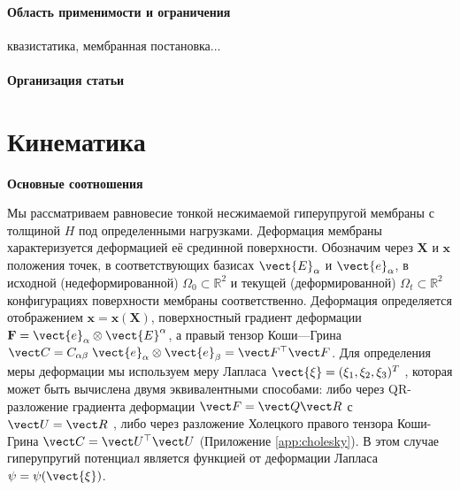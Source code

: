 
\paragraph{Область применимости и ограничения}
квазистатика, мембранная постановка...

\paragraph{Организация статьи}

\section{Кинематика}
\textbf{Основные соотношения}

Мы рассматриваем равновесие тонкой несжимаемой гиперупругой мембраны с толщиной $H$ под
определенными нагрузками.
Деформация мембраны характеризуется деформацией её срединной поверхности. 
Обозначим через \(\mathbf{X}\) и \(\mathbf{x}\) положения точек, 
в соответствующих базисах \(\vect{E}_{\alpha}\) и \(\vect{e}_{\alpha}\), 
в исходной (недеформированной) \(\Omega_0 \subset \mathbb{R}^2\) и текущей (деформированной) \(\Omega_t \subset \mathbb{R}^2\)
конфигурациях поверхности мембраны соответственно. 
Деформация определяется отображением \(\mathbf{x} = \mathbf{x}(\mathbf{X})\), 
поверхностный градиент деформации \(\mathbf{F} = \vect{e}_{\alpha} \otimes \vect{E}^{\alpha}\),
а правый тензор Коши—Грина \(\vect C = C_{\alpha\beta} \;\vect{e}_{\alpha} \otimes \vect{e}_{\beta} = \vect F^{\top} \vect F\). 
Для определения меры деформации мы используем меру Лапласа \(\vect{\xi} = (\xi_1 , \xi_2 , \xi_3)^T\) \cite{xi2023},
которая может быть вычислена двумя эквивалентными способами: 
либо через QR-разложение градиента деформации \(\vect F = \vect Q \vect R\) с \(\vect U = \vect R\) , 
либо через разложение Холецкого правого тензора Коши-Грина \(\vect C = \vect U^{\top}\vect U\) (Приложение \ref{app:cholesky}).
В этом случае гиперупругий потенциал является функцией от деформации Лапласа \(\psi = \psi(\vect{\xi})\).


